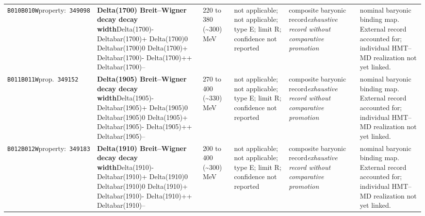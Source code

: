 \begin{landscape}
\begin{longtable}{L{1.85cm}L{4.45cm}L{2.35cm}L{4.05cm}L{3.35cm}L{7.15cm}}
\texttt{B010}\newline \texttt{B010W}\newline property:\ \texttt{349098} & \textbf{Delta(1700) Breit--Wigner decay decay width}\newline Delta(1700)- \textbar{}\allowbreak{} Deltabar(1700)+ \textbar{}\allowbreak{} Delta(1700)0 \textbar{}\allowbreak{} Deltabar(1700)0 \textbar{}\allowbreak{} Delta(1700)+ \textbar{}\allowbreak{} Deltabar(1700)- \textbar{}\allowbreak{} Delta(1700)++ \textbar{}\allowbreak{} Deltabar(1700)-- & 220 to 380 (\textasciitilde{}300)\,MeV & not applicable; not applicable; type E; limit R; confidence not reported & composite baryonic record\newline \emph{exhaustive record without comparative promotion} & nominal baryonic binding map. External record accounted for; individual HMT--MD realization not yet linked. \\
\texttt{B011}\newline \texttt{B011W}\newline prop.\ \texttt{349152} & \textbf{Delta(1905) Breit--Wigner decay decay width}\newline Delta(1905)- \textbar{}\allowbreak{} Deltabar(1905)+ \textbar{}\allowbreak{} Delta(1905)0 \textbar{}\allowbreak{} Deltabar(1905)0 \textbar{}\allowbreak{} Delta(1905)+ \textbar{}\allowbreak{} Deltabar(1905)- \textbar{}\allowbreak{} Delta(1905)++ \textbar{}\allowbreak{} Deltabar(1905)-- & 270 to 400 (\textasciitilde{}330)\,MeV & not applicable; not applicable; type E; limit R; confidence not reported & composite baryonic record\newline \emph{exhaustive record without comparative promotion} & nominal baryonic binding map. External record accounted for; individual HMT--MD realization not yet linked. \\
\texttt{B012}\newline \texttt{B012W}\newline property:\ \texttt{349183} & \textbf{Delta(1910) Breit--Wigner decay decay width}\newline Delta(1910)- \textbar{}\allowbreak{} Deltabar(1910)+ \textbar{}\allowbreak{} Delta(1910)0 \textbar{}\allowbreak{} Deltabar(1910)0 \textbar{}\allowbreak{} Delta(1910)+ \textbar{}\allowbreak{} Deltabar(1910)- \textbar{}\allowbreak{} Delta(1910)++ \textbar{}\allowbreak{} Deltabar(1910)-- & 200 to 400 (\textasciitilde{}300)\,MeV & not applicable; not applicable; type E; limit R; confidence not reported & composite baryonic record\newline \emph{exhaustive record without comparative promotion} & nominal baryonic binding map. External record accounted for; individual HMT--MD realization not yet linked. \\

\end{longtable}
\end{landscape}
